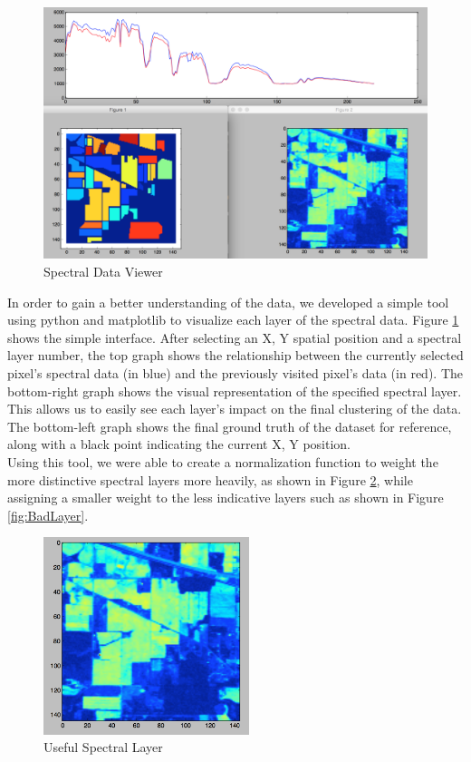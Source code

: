 \documentclass[journal]{IEEEtran}
\begin{document}
    \begin{figure}[h!]
      \centering\includegraphics[width=\columnwidth]{images/tool.png}
      \caption{Spectral Data Viewer}
      \label{fig:Viewer}
    \end{figure}

    In order to gain a better understanding of the data, we developed a simple tool using python and matplotlib to visualize each layer of the spectral data. Figure \ref{fig:Viewer} shows the simple interface. After selecting an X, Y spatial position and a spectral layer number, the top graph shows the relationship between the currently selected pixel’s spectral data (in blue) and the previously visited pixel’s data (in red). The bottom-right graph shows the visual representation of the specified spectral layer. This allows us to easily see each layer’s impact on the final clustering of the data. The bottom-left graph shows the final ground truth of the dataset for reference, along with a black point indicating the current X, Y position.\\

    Using this tool, we were able to create a normalization function to weight the more distinctive spectral layers more heavily, as shown in Figure \ref{fig:GoodLayer}, while assigning a smaller weight to the less indicative layers such as shown in Figure \ref{fig:BadLayer}.\\


    \begin{figure}[h!]
      \centering\includegraphics[width=6cm]{images/allStarSpec.png}
      \caption{Useful Spectral Layer}
      \label{fig:GoodLayer}
    \end{figure}
\end{document}
